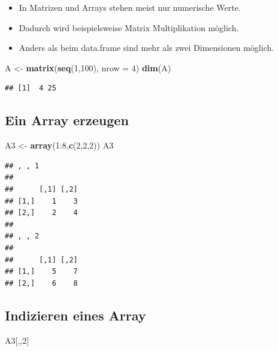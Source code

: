 \documentclass[]{article}
\newenvironment{Shaded}{\begin{snugshade}}{\end{snugshade}}
\newcommand{\KeywordTok}[1]{\textcolor[rgb]{0.13,0.29,0.53}{\textbf{{#1}}}}
\newcommand{\DataTypeTok}[1]{\textcolor[rgb]{0.13,0.29,0.53}{{#1}}}
\newcommand{\DecValTok}[1]{\textcolor[rgb]{0.00,0.00,0.81}{{#1}}}
\newcommand{\StringTok}[1]{\textcolor[rgb]{0.31,0.60,0.02}{{#1}}}
\newcommand{\NormalTok}[1]{{#1}}
\providecommand{\tightlist}{%
  \setlength{\itemsep}{0pt}\setlength{\parskip}{0pt}}
\begin{document}
\begin{itemize}
\tightlist
\item
  In Matrizen und Arrays stehen meist nur numerische Werte.
\item
  Dadurch wird beispielsweise Matrix Multiplikation möglich.
\item
  Anders als beim data.frame sind mehr als zwei Dimensionen möglich.
\end{itemize}

\begin{Shaded}
\begin{Highlighting}[]
\NormalTok{A <-}\StringTok{ }\KeywordTok{matrix}\NormalTok{(}\KeywordTok{seq}\NormalTok{(}\DecValTok{1}\NormalTok{,}\DecValTok{100}\NormalTok{), }\DataTypeTok{nrow =} \DecValTok{4}\NormalTok{)}
\KeywordTok{dim}\NormalTok{(A)}
\end{Highlighting}
\end{Shaded}

\begin{verbatim}
## [1]  4 25
\end{verbatim}

\subsection{Ein Array erzeugen}\label{ein-array-erzeugen}

\begin{Shaded}
\begin{Highlighting}[]
\NormalTok{A3 <-}\StringTok{ }\KeywordTok{array}\NormalTok{(}\DecValTok{1}\NormalTok{:}\DecValTok{8}\NormalTok{,}\KeywordTok{c}\NormalTok{(}\DecValTok{2}\NormalTok{,}\DecValTok{2}\NormalTok{,}\DecValTok{2}\NormalTok{))}
\NormalTok{A3}
\end{Highlighting}
\end{Shaded}

\begin{verbatim}
## , , 1
## 
##      [,1] [,2]
## [1,]    1    3
## [2,]    2    4
## 
## , , 2
## 
##      [,1] [,2]
## [1,]    5    7
## [2,]    6    8
\end{verbatim}

\subsection{Indizieren eines Array}\label{indizieren-eines-array}

\begin{Shaded}
\begin{Highlighting}[]
\NormalTok{A3[,,}\DecValTok{2}\NormalTok{]}
\end{Highlighting}
\end{Shaded}
\end{document}
